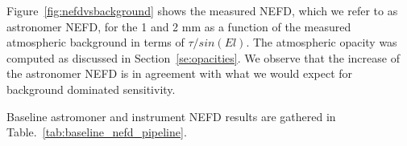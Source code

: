 
 Figure~\ref{fig:nefdvsbackground} shows the measured NEFD, which we refer to as
 astronomer NEFD, for the 1 and 2 mm as a function of the measured atmospheric
 background in terms of $\tau/sin(El)$. The atmospheric opacity was computed as
 discussed in Section~\ref{se:opacities}. We observe that the increase of the
 astronomer NEFD is in agreement with what we would expect for background
 dominated sensitivity.

Baseline astromoner and instrument NEFD results are gathered in
Table.~\ref{tab:baseline_nefd_pipeline}.

